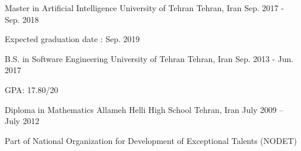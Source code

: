 

\begin{cventries}
  
  \cventry
    {Master in Artificial Intelligence} %
    {University of Tehran} %
    {Tehran, Iran} %
    {Sep. 2017 - Sep. 2018} %
    {
      \begin{cvitems} %
        \item {Expected graduation date : Sep. 2019}
      \end{cvitems}
    }
  \cventry
    {B.S. in Software Engineering} %
    {University of Tehran} %
    {Tehran, Iran} %
    {Sep. 2013 - Jun. 2017} %
    {
      \begin{cvitems} %
        \item {GPA: 17.80/20}
      \end{cvitems}
    }
    
  \cventry
  	{Diploma in Mathematics}
  	{Allameh Helli High School}
  	{Tehran, Iran}
  	{July 2009 – July 2012}
  	{
      \begin{cvitems} %
        \item {Part of National Organization for Development of Exceptional Talents (NODET)}
      \end{cvitems}
    }

\end{cventries}
